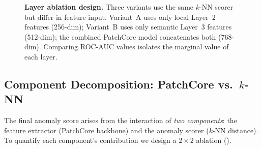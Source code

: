 \begin{figure}[H]
\caption{%
  \textbf{Layer ablation design.}
  Three variants use the same $k$-NN scorer but differ in feature input.
  Variant~A uses only local Layer~2 features (256-dim);
  Variant~B uses only semantic Layer~3 features (512-dim);
  the combined PatchCore model concatenates both (768-dim).
  Comparing ROC-AUC values isolates the marginal value of each layer.}
\label{fig:ablation_diagram}
\end{figure}

\subsection{Component Decomposition: PatchCore vs.\ $k$-NN}
\label{sec:patchcore:decomp}

The final anomaly score arises from the interaction of \emph{two
components}: the feature extractor (PatchCore backbone) and the anomaly
scorer ($k$-NN distance).  To quantify each component's contribution we
design a $2\times2$ ablation ().

